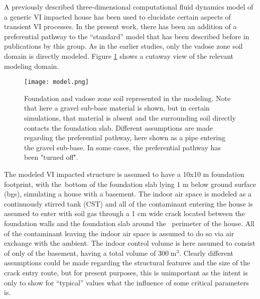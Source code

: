\documentclass[preprint,12pt]{elsarticle}
\begin{document}
A previously described three-dimensional computational fluid dynamics model of a generic VI impacted house has been used to elucidate certain aspects of transient VI processes.
In the present work, there has been an addition of a preferential pathway to the “standard” model that has been described before in publications by this group\cite{shen_influence_2013,yao_investigating_2017,yao_three-dimensional_2017}.
As in the earlier studies, only the vadose zone soil domain is directly modeled.
Figure \ref{fig:model} shows a cutaway view of the relevant modeling domain.\par

\begin{figure}[htb!]
  \centering
 \texttt{[image: model.png]}
 \caption{Foundation and vadose zone soil represented in the modeling. Note that here a gravel sub-base material is shown, but in certain simulations, that material is absent and the surrounding soil directly contacts the foundation slab.  Different assumptions are made regarding the preferential pathway, here shown as a pipe entering the gravel sub-base. In some cases, the preferential pathway has been "turned off".}\label{fig:model}
\end{figure}

The modeled VI impacted structure is assumed to have a 10x10 m foundation footprint, with the bottom of the foundation slab lying 1 m below ground surface (bgs), simulating a house with a basement.
The indoor air space is modeled as a continuously stirred tank (CST)\cite{u.s._environmental_protection_agency_oswer_2015} and all of the contaminant entering the house is assumed to enter with soil gas through a 1 cm wide crack located between the foundation walls and the foundation slab around the  perimeter of the house.
All of the contaminant leaving the indoor air space is assumed to do so via air exchange with the ambient.
The indoor control volume is here assumed to consist of only of the basement, having a total volume of $300 \; \mathrm{m^3}$.
Clearly different assumptions could be made regarding the structural features and the size of the crack entry route, but for present purposes, this is unimportant as the intent is only to show for “typical” values what the influence of some critical parameters is.\par
\end{document}
